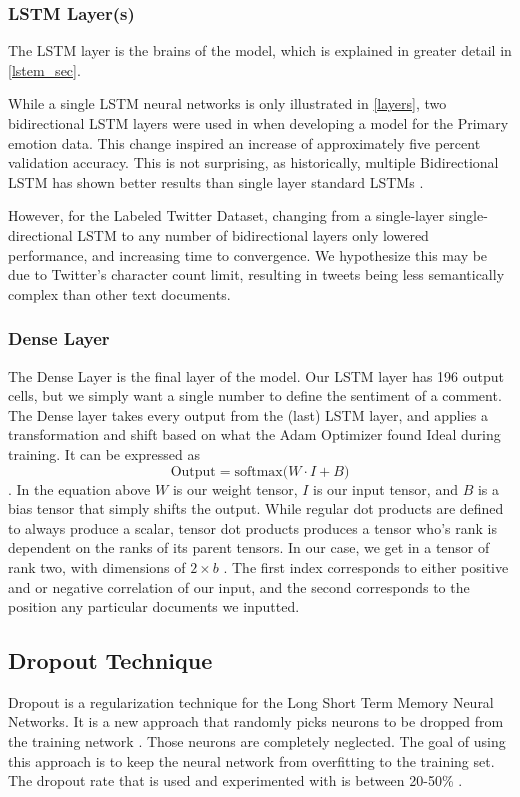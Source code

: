 \documentclass[titlepage,letterpaper]{article}
\begin{document}
 \subsubsection{LSTM Layer(s)}
The LSTM layer is the brains of the model, which is explained in greater detail in \cref{lstem_sec}.

While a single LSTM neural networks is only illustrated in \cref{layers},  two bidirectional LSTM layers were used in when developing a model for the Primary emotion data. This change inspired an increase of approximately five percent validation accuracy. This is not surprising, as historically, multiple Bidirectional LSTM has shown better results than single layer standard LSTMs \cite{Keras.io,deep_bi}. 

However, for the Labeled Twitter Dataset, changing from a single-layer single-directional LSTM to any number of bidirectional layers  only lowered performance,  and increasing time to convergence.  We hypothesize this may be due to Twitter's character count limit, resulting in tweets being less semantically complex than other text documents.


\subsubsection{Dense Layer}
The Dense Layer is the final layer of the model. Our LSTM layer has 196 output cells, but we simply want a single number to define the sentiment of a comment.  The Dense layer takes every output from the (last) LSTM layer, and applies a transformation and shift based on what the Adam Optimizer found Ideal during training. It can be expressed as
\[ \text{Output} = \text{softmax(} W \cdot I + B ) \].
In the equation above \(W\) is our weight tensor, \(I\) is our input tensor, and \(B\) is a bias tensor that simply shifts the output. While regular dot products are defined to always produce a scalar, tensor dot products produces a tensor who's rank is dependent on the ranks of its parent tensors. In our case, we get in a tensor of rank two, with dimensions of \(2\times b\) . The first index corresponds to either positive and or negative correlation of our input, and the second corresponds to the position any particular documents we inputted. \cite{tensors, tensorflow}

\subsection{Dropout Technique}
Dropout is a regularization technique for the Long Short Term Memory Neural Networks. It is a new approach that randomly picks neurons to be dropped from the training network \cite{NeuralNet}. Those neurons are completely neglected. The goal of using this approach is to keep the neural network from overfitting to the training set. The dropout rate that is used and experimented with is between 20-50\% \cite{NeuralNet}.
\end{document}
